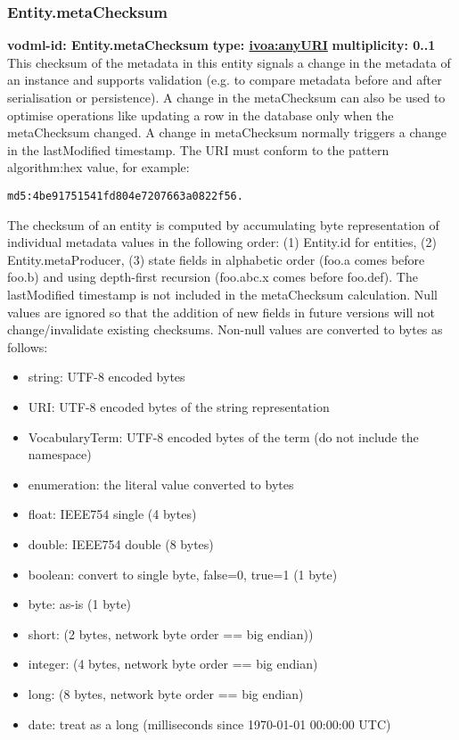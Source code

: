     \subsubsection{Entity.metaChecksum}
      \textbf{vodml-id: Entity.metaChecksum} \newline
      \textbf{type: \hyperref[sect:ivoa]{ivoa:anyURI}} \newline
      \textbf{multiplicity: 0..1} \newline
      This checksum of the metadata in this entity signals a change in the metadata of an instance and supports validation (e.g. to compare metadata before and after serialisation or persistence). A change in the metaChecksum can also be used to optimise operations like updating a row in the database only when the metaChecksum changed. A change in metaChecksum normally triggers a change in the lastModified timestamp. The URI must conform to the pattern {algorithm}:{hex value}, for example: \begin{verbatim}md5:4be91751541fd804e7207663a0822f56.\end{verbatim} The checksum of an entity is computed by accumulating byte representation of individual metadata values in the following order: (1) Entity.id for entities, (2) Entity.metaProducer, (3) state fields in alphabetic order (foo.a comes before foo.b) and using depth-first recursion (foo.abc.x comes before foo.def). The lastModified timestamp is not included in the metaChecksum calculation. Null values are ignored so that the addition of new fields in future versions will not change/invalidate existing checksums. Non-null values are converted to bytes as follows: \begin{itemize} \item string: UTF-8 encoded bytes \item URI: UTF-8 encoded bytes of the string representation \item VocabularyTerm: UTF-8 encoded bytes of the term (do not include the namespace) \item enumeration: the literal value converted to bytes \item float: IEEE754 single (4 bytes) \item double: IEEE754 double (8 bytes) \item boolean: convert to single byte, false=0, true=1 (1 byte) \item byte: as-is (1 byte) \item short: (2 bytes, network byte order == big endian)) \item integer: (4 bytes, network byte order == big endian) \item long: (8 bytes, network byte order == big endian) \item date: treat as a long (milliseconds since 1970-01-01 00:00:00 UTC) \end{itemize}  

